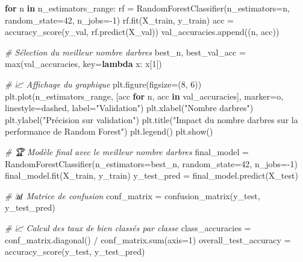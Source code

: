 \documentclass[
  letterpaper,
  DIV=11,
  numbers=noendperiod]{scrartcl}
\newenvironment{Shaded}{}{}
\newcommand{\BuiltInTok}[1]{\textcolor[rgb]{0.00,0.50,0.00}{#1}}
\newcommand{\CommentTok}[1]{\textcolor[rgb]{0.38,0.63,0.69}{\textit{#1}}}
\newcommand{\ControlFlowTok}[1]{\textcolor[rgb]{0.00,0.44,0.13}{\textbf{#1}}}
\newcommand{\DecValTok}[1]{\textcolor[rgb]{0.25,0.63,0.44}{#1}}
\newcommand{\KeywordTok}[1]{\textcolor[rgb]{0.00,0.44,0.13}{\textbf{#1}}}
\newcommand{\NormalTok}[1]{#1}
\newcommand{\OperatorTok}[1]{\textcolor[rgb]{0.40,0.40,0.40}{#1}}
\newcommand{\StringTok}[1]{\textcolor[rgb]{0.25,0.44,0.63}{#1}}
\begin{document}
\begin{Shaded}
\begin{Highlighting}[]
\ControlFlowTok{for}\NormalTok{ n }\KeywordTok{in}\NormalTok{ n\_estimators\_range:}
\NormalTok{    rf }\OperatorTok{=}\NormalTok{ RandomForestClassifier(n\_estimators}\OperatorTok{=}\NormalTok{n, random\_state}\OperatorTok{=}\DecValTok{42}\NormalTok{, n\_jobs}\OperatorTok{={-}}\DecValTok{1}\NormalTok{)}
\NormalTok{    rf.fit(X\_train, y\_train)}
\NormalTok{    acc }\OperatorTok{=}\NormalTok{ accuracy\_score(y\_val, rf.predict(X\_val))}
\NormalTok{    val\_accuracies.append((n, acc))}

\CommentTok{\# Sélection du meilleur nombre d\textquotesingle{}arbres}
\NormalTok{best\_n, best\_val\_acc }\OperatorTok{=} \BuiltInTok{max}\NormalTok{(val\_accuracies, key}\OperatorTok{=}\KeywordTok{lambda}\NormalTok{ x: x[}\DecValTok{1}\NormalTok{])}


\CommentTok{\# 📈 Affichage du graphique}
\NormalTok{plt.figure(figsize}\OperatorTok{=}\NormalTok{(}\DecValTok{8}\NormalTok{, }\DecValTok{6}\NormalTok{))}
\NormalTok{plt.plot(n\_estimators\_range, [acc }\ControlFlowTok{for}\NormalTok{ n, acc }\KeywordTok{in}\NormalTok{ val\_accuracies], marker}\OperatorTok{=}\StringTok{\textquotesingle{}o\textquotesingle{}}\NormalTok{, linestyle}\OperatorTok{=}\StringTok{\textquotesingle{}dashed\textquotesingle{}}\NormalTok{, label}\OperatorTok{=}\StringTok{"Validation"}\NormalTok{)}
\NormalTok{plt.xlabel(}\StringTok{"Nombre d\textquotesingle{}arbres"}\NormalTok{)}
\NormalTok{plt.ylabel(}\StringTok{"Précision sur validation"}\NormalTok{)}
\NormalTok{plt.title(}\StringTok{"Impact du nombre d\textquotesingle{}arbres sur la performance de Random Forest"}\NormalTok{)}
\NormalTok{plt.legend()}
\NormalTok{plt.show()}

\CommentTok{\# 🏆 Modèle final avec le meilleur nombre d\textquotesingle{}arbres}
\NormalTok{final\_model }\OperatorTok{=}\NormalTok{ RandomForestClassifier(n\_estimators}\OperatorTok{=}\NormalTok{best\_n, random\_state}\OperatorTok{=}\DecValTok{42}\NormalTok{, n\_jobs}\OperatorTok{={-}}\DecValTok{1}\NormalTok{)}
\NormalTok{final\_model.fit(X\_train, y\_train)}
\NormalTok{y\_test\_pred }\OperatorTok{=}\NormalTok{ final\_model.predict(X\_test)}

\CommentTok{\# 📊 Matrice de confusion}
\NormalTok{conf\_matrix }\OperatorTok{=}\NormalTok{ confusion\_matrix(y\_test, y\_test\_pred)}

\CommentTok{\# 📈 Calcul des taux de bien classés par classe}
\NormalTok{class\_accuracies }\OperatorTok{=}\NormalTok{ conf\_matrix.diagonal() }\OperatorTok{/}\NormalTok{ conf\_matrix.}\BuiltInTok{sum}\NormalTok{(axis}\OperatorTok{=}\DecValTok{1}\NormalTok{)}
\NormalTok{overall\_test\_accuracy }\OperatorTok{=}\NormalTok{ accuracy\_score(y\_test, y\_test\_pred)}


\end{Highlighting}
\end{Shaded}
\end{document}
